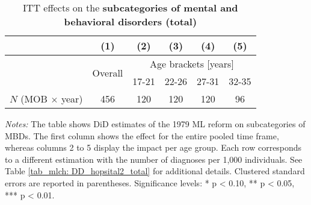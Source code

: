 \newpage
{} 
\vspace*{\fill}
\begin{table}[H] \centering 
	\begin{threeparttable} \centering \caption{ITT effects on the \textbf{subcategories of mental and behavioral disorders (total)}}\label{tab_mlch: ITT_across_d5subcategories_per_age_group_total}
		{\def\sym#1{\ifmmode^{#1}\else\(^{#1}\)\fi} 
			\begin{tabular}{l*{5}{c}}
				\toprule 
				&\multicolumn{1}{c}{(1)}&\multicolumn{1}{c}{(2)}&\multicolumn{1}{c}{(3)}&\multicolumn{1}{c}{(4)}&\multicolumn{1}{c}{(5)}\\
				\midrule
				&\multirow{2}{*}{Overall} & \multicolumn{4}{c}{Age brackets [years]} \\ 
				\cmidrule(lr){3-6}
				&&\multicolumn{1}{c}{17-21}&\multicolumn{1}{c}{22-26}&\multicolumn{1}{c}{27-31}&\multicolumn{1}{c}{32-35}\\
				
				\midrule
				
				
				\midrule
				\(N\) (MOB $\times$ year)& 456 & 120 & 120 & 120 & 96\\
				\bottomrule 
		\end{tabular}}
	\end{threeparttable} 
	\begin{minipage}{0.9\linewidth}
		\scriptsize \emph{Notes:} The table shows DiD estimates of the 1979 ML reform on subcategories of MBDs. The first column shows the effect for the entire pooled time frame, whereas columns 2 to 5 display the impact per age group. Each row corresponds to a different estimation with the number of diagnoses per 1,000 individuals. See Table \ref{tab_mlch: DD_hopsital2_total} for additional details. Clustered standard errors are reported in parentheses. \newline Significance levels: * p < 0.10, ** p < 0.05, *** p < 0.01. \newline 	%
	\end{minipage}
\end{table} 
\vspace*{\fill}\clearpage 
\restoregeometry

